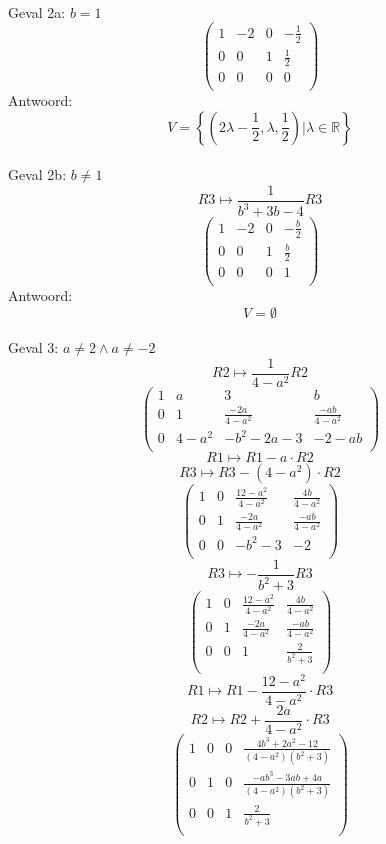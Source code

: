\documentclass[10pt,a4paper]{article}
\begin{document}
\\Geval 2a: $b=1$
\[
\begin{pmatrix}
1 & -2 & 0 & -\frac{1}{2}\\
0 & 0 & 1 & \frac{1}{2}\\
0 & 0 & 0 & 0\\
\end{pmatrix}
\]
Antwoord:
\[
V= \left\lbrace \left(2\lambda-\frac{1}{2},\lambda,\frac{1}{2}\right)| \lambda \in \mathbb{R}\right\rbrace
\]
\\Geval 2b: $b \neq 1$
\[ R3 \longmapsto \frac{1}{b^3+3b-4}R3 \]
\[
\begin{pmatrix}
1 & -2 & 0 & -\frac{b}{2}\\
0 & 0 & 1 & \frac{b}{2}\\
0 & 0 & 0 & 1\\
\end{pmatrix}
\]
Antwoord:
\[
V= \emptyset
\]
\\Geval 3: $a\neq 2 \wedge a \neq -2$ 
\[ R2 \longmapsto \frac{1}{4-a^{2}}R2 \]
\[
\begin{pmatrix}
1 & a & 3 & b\\
0 & 1 & \frac{-2a}{4-a^{2}} & \frac{-ab}{4-a^{2}}\\
0 & 4-a^{2} & -b^{2}-2a-3 & -2-ab\\
\end{pmatrix}
\]
\[ R1 \longmapsto R1 - a \cdot R2 \]
\[ R3 \longmapsto R3 - (4-a^{2}) \cdot R2 \]
\[
\begin{pmatrix}
1 & 0 & \frac{12-a^{2}}{4-a^{2}} & \frac{4b}{4-a^{2}}\\
0 & 1 & \frac{-2a}{4-a^{2}} & \frac{-ab}{4-a^{2}}\\
0 & 0 & -b^{2}-3 & -2\\
\end{pmatrix}
\]
\[ R3 \longmapsto -\frac{1}{b^{2}+3}R3\]
\[
\begin{pmatrix}
1 & 0 & \frac{12-a^{2}}{4-a^{2}} & \frac{4b}{4-a^{2}}\\
0 & 1 & \frac{-2a}{4-a^{2}} & \frac{-ab}{4-a^{2}}\\
0 & 0 & 1 & \frac{2}{b^{2}+3}\\
\end{pmatrix}
\]
\[ R1 \longmapsto R1 - \frac{12-a^{2}}{4-a^{2}} \cdot R3 \]
\[ R2 \longmapsto R2 + \frac{2a}{4-a^{2}} \cdot R3 \]
\[
\begin{pmatrix}
1 & 0 & 0 & \frac{4b^{3}+2a^{2}-12}{(4-a^{2})(b^{2}+3)}\\
0 & 1 & 0 & \frac{-ab^{3}-3ab+4a}{(4-a^{2})(b^{2}+3)}\\
0 & 0 & 1 & \frac{2}{b^{2}+3}\\
\end{pmatrix}
\]
\end{document}
